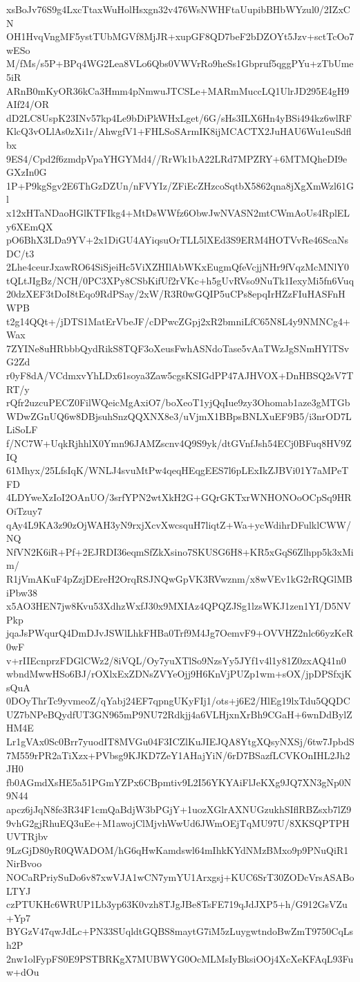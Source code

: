xsBoJv76S9g4LxcTtaxWuHolHsxgn32v476WsNWHFtaUupibBHbWYzul0/2IZxCN
OH1HvqVngMF5ystTUbMGVf8MjJR+xupGF8QD7beF2bDZOYt5Jzv+sctTcOo7wESo
M/fMs/s5P+BPq4WG2Lea8VLo6Qbs0VWVrRo9heSs1Gbpruf5qggPYu+zTbUme5iR
ARnB0mKyOR36kCa3Hmm4pNmwuJTCSLe+MARmMuccLQ1UlrJD295E4gH9AIf24/OR
dD2LC8UspK23INv57kp4Le9bDiPkWHxLget/6G/sHs3ILX6Hn4yBSi494kz6wlRF
KlcQ3vOLlAs0zXi1r/AhwgfV1+FHLSoSArmIK8ijMCACTX2JuHAU6Wu1euSdflbx
9ES4/Cpd2f6zmdpVpaYHGYMd4//RrWk1bA22LRd7MPZRY+6MTMQheDI9eGXzIn0G
1P+P9kgSgv2E6ThGzDZUn/nFVYIz/ZFiEcZHzcoSqtbX5862qna8jXgXmWzl61Gl
x12xHTaNDaoHGlKTFIkg4+MtDsWWfz6ObwJwNVASN2mtCWmAoUs4RplELy6XEmQX
pO6BhX3LDa9YV+2x1DiGU4AYiqsuOrTLL5lXEd3S9ERM4HOTVvRe46ScaNsDC/t3
2Lhe4ceurJxawRO64SiSjeiHc5ViXZHIlAbWKxEugmQfeVcjjNHr9fVqzMcMNlY0
tQLtJIgBz/NCH/0PC3XPy8CSbKifUf2rVKc+h5gUvRVso9NuTk1IexyMi5fn6Vuq
20dzXEF3tDoI8tEqo9RdPSay/2xW/R3R0wGQIP5uCPs8epqIrHZzFIuHASFnHWPB
t2g14QQt+/jDTS1MatErVbeJF/cDPwcZGpj2xR2bmniLfC65N8L4y9NMNCg4+Wax
7ZYINe8uHRbbbQydRikS8TQF3oXeusFwhASNdoTase5vAaTWzJgSNmHYlTSvG2Zd
r0yF8dA/VCdmxvYhLDx61soya3Zaw5cgsKSIGdPP47AJHVOX+DnHBSQ2sV7TRT/y
rQfr2uzcuPECZ0FilWQeicMgAxiO7/boXeoT1yjQqIue9zy3Ohomab1aze3gMTGb
WDwZGnUQ6w8DBjsuhSnzQQXNX8e3/uVjmX1BBpsBNLXuEF9B5/i3nrOD7LLiSoLF
f/NC7W+UqkRjhhlX0Ymn96JAMZscnv4Q9S9yk/dtGVnfJsh54ECj0BFuq8HV9ZIQ
61Mhyx/25LfsIqK/WNLJ4svuMtPw4qeqHEqgEES7l6pLExIkZJBVi01Y7aMPeTFD
4LDYweXzIoI2OAnUO/3srfYPN2wtXkH2G+GQrGKTxrWNHONOoOCpSq9HROiTzuy7
qAy4L9KA3z90zOjWAH3yN9rxjXcvXwcsquH7liqtZ+Wa+ycWdihrDFulklCWW/NQ
NfVN2K6iR+Pf+2EJRDI36eqmSfZkXsino7SKUSG6H8+KR5xGqS6Zlhpp5k3xMim/
R1jVmAKuF4pZzjDEreH2OrqRSJNQwGpVK3RVwznm/x8wVEv1kG2rRQGlMBiPbw38
x5AO3HEN7jw8Kvu53XdhzWxfJ30x9MXIAz4QPQZJSg1lzsWKJ1zen1YI/D5NVPkp
jqaJsPWqurQ4DmDJvJSWlLhkFHBa0Trf9M4Jg7OemvF9+OVVHZ2nlc66yzKeR0wF
v+rIIEcnprzFDGlCWz2/8iVQL/Oy7yuXTlSo9NzsYy5JYf1v4l1y81Z0zxAQ41n0
wbndMwwHSo6BJ/rOXlxExZDNsZVYeOjj9H6KnVjPUZp1wm+sOX/jpDPSfxjKsQuA
0DOyThrTc9yvmeoZ/qYabj24EF7qpngUKyFIj1/ots+j6E2/HlEg19lxTdu5QQDC
UZ7bNPeBQydfUT3GN965mP9NU72Rdkjj4a6VLHjxnXrBh9CGaH+6wnDdBylZHM4E
Lr1gVAx0Sc0Brr7yuodIT8MVGu04F3ICZlKuJIEJQA8YtgXQsyNXSj/6tw7JpbdS
7M559rPR2aTiXzx+PVbsg9KJKD7ZeY1AHajYiN/6rD7BSazfLCVKOnIHL2Jh2JH0
fb0AGmdXsHE5a51PGmYZPx6CBpmtiv9L2I56YKYAiFlJeKXg9JQ7XN3gNp0N9N44
apcz6jJqN8fe3R34F1cmQaBdjW3bPGjY+1uozXGlrAXNUGzukhSIflRBZsxb7lZ9
9vhG2gjRhuEQ3uEe+M1awojClMjvhWwUd6JWmOEjTqMU97U/8XKSQPTPHUVTRjbv
9LzGjD80yR0QWADOM/hG6qHwKamdswl64mIhkKYdNMzBMxo9p9PNuQiR1NirBvoo
NOCaRPriySuDo6v87xwVJA1wCN7ymYU1Arxgsj+KUC6SrT30ZODcVrsASABoLTYJ
czPTUKHc6WRUP1Lb3yp63K0vzh8TJgJBe8TsFE719qJdJXP5+h/G912GsVZu+Yp7
BYGzV47qwJdLc+PN33SUqldtGQBS8maytG7iM5zLuygwtndoBwZmT9750CqLsh2P
2nw1olFypFS0E9PSTBRKgX7MUBWYG0OcMLMsIyBksiOOj4XcXeKFAqL93Fuw+dOu

